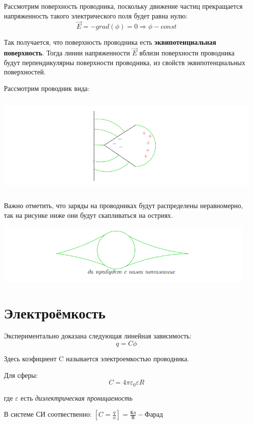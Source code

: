 \documentclass[../main.tex]{subfiles}
\begin{document}
Рассмотрим поверхность проводника, поскольку движение частиц прекращается напряженность такого электрического поля будет равна нулю:
\[\vec E = - grad(\phi) = 0 \Rightarrow \phi - const \]

Так получается, что поверхность проводника есть \textbf{эквипотенциальная поверхность}. Тогда линии напряженности $\vec E$ вблизи
поверхности проводника будут перпендикулярны поверхности проводника, из свойств эквипотенциальных поверхностей.

Рассмотрим проводник вида:
\begin{center}
    \includegraphics[width=16cm, height=5cm]{../img/provod.png}
\end{center}


Важно отметить, что заряды на проводниках будут распределены неравномерно, так на рисунке ниже они будут скапливаться на остриях.
\begin{center}
    \includegraphics[width=13cm, height=3cm]{../img/ioda.png}
\end{center}

\section{Электроёмкость}
Экспериментально доказана следующая линейная зависимость:
\[q = C \phi\]

 Здесь коэфициент C называется электроемкостью проводника.

Для сферы:
\[ C = 4 \pi \varepsilon_0 \varepsilon R\]
\begin{center}
    где $\varepsilon$ есть \textit{диэлектрическая проницаемость}
\end{center}
В системе СИ соотвественно: $[C = \frac{q}{\phi}] = \frac{\text{Кл}}{\text{В}} - \text{Фарад}$
\end{document}
